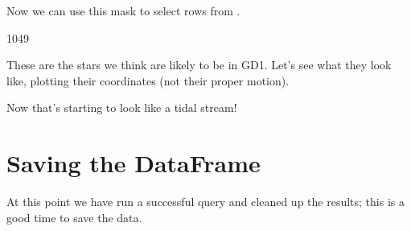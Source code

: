 \documentclass[letterpaper,10pt,english]{sphinxmanual}
\begin{document}
Now we can use this mask to select rows from .

\begin{sphinxVerbatim}[commandchars=\\\{\}]
  \PYG{p}{[}\PYG{p}{]}
\end{sphinxVerbatim}

\begin{sphinxVerbatim}[commandchars=\\\{\}]
1049
\end{sphinxVerbatim}

These are the stars we think are likely to be in GD\sphinxhyphen{}1.  Let’s see what they look like, plotting their coordinates (not their proper motion).

\begin{sphinxVerbatim}[commandchars=\\\{\}]
  \PYG{p}{[}\PYG{p}{]}
  \PYG{p}{[}\PYG{p}{]}

    

\end{sphinxVerbatim}

\noindent{}

Now that’s starting to look like a tidal stream!


\section{Saving the DataFrame}
\label{\detokenize{03_motion:saving-the-dataframe}}
At this point we have run a successful query and cleaned up the results; this is a good time to save the data.
\end{document}
